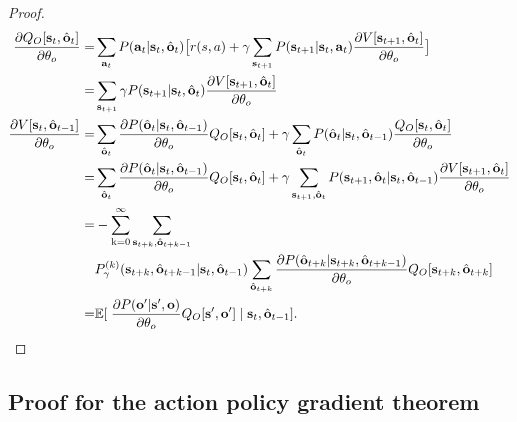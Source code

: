 \begin{proof}
    \begin{align*}
      \frac{\partial Q_O[{\mathbf{s}}_t,\hat{{\mathbf{o}}}_t]}{ \partial \theta_o }=& \sum_{{\mathbf{a}}_t}P({\mathbf{a}}_t|{\mathbf{s}}_t,\hat{{\mathbf{o}}}_t)\big[r(s,a) + \gamma\sum_{{\mathbf{s}}_{t+1}}P({\mathbf{s}}_{t+1}|{\mathbf{s}}_t,{\mathbf{a}}_t)\frac{\partial V[{\mathbf{s}}_{t+1},\hat{{\mathbf{o}}}_t]}{\partial \theta_o}\big]\\
      =&\sum_{{\mathbf{s}}_{t+1}}\gamma P({\mathbf{s}}_{t+1}|{\mathbf{s}}_t,\hat{{\mathbf{o}}}_t)\frac{\partial V[{\mathbf{s}}_{t+1},\hat{{\mathbf{o}}}_t]}{\partial \theta_o}\\
      \frac{\partial V[{\mathbf{s}}_t,\hat{{\mathbf{o}}}_{t-1}]}{\partial \theta_o}=&\sum_{\hat{{\mathbf{o}}}_t}\frac{\partial P(\hat{{\mathbf{o}}}_t|{\mathbf{s}}_t,\hat{{\mathbf{o}}}_{t-1})}{\partial \theta_o}Q_O[{\mathbf{s}}_t,\hat{{\mathbf{o}}}_t]+\gamma\sum_{\hat{{\mathbf{o}}}_t}P(\hat{{\mathbf{o}}}_t|{\mathbf{s}}_t,\hat{{\mathbf{o}}}_{t-1})\frac{Q_O[{\mathbf{s}}_t,\hat{{\mathbf{o}}}_t]}{\partial \theta_o}\\
      =&\sum_{\hat{{\mathbf{o}}}_t}\frac{\partial P(\hat{{\mathbf{o}}}_t|{\mathbf{s}}_t,\hat{{\mathbf{o}}}_{t-1})}{\partial \theta_o}Q_O[{\mathbf{s}}_t,\hat{{\mathbf{o}}}_t]
         +\gamma\sum_{{\mathbf{s}}_{t+1},\hat{{\mathbf{o}}}_t}P({\mathbf{s}}_{t+1},\hat{{\mathbf{o}}}_t|{\mathbf{s}}_t,\hat{{\mathbf{o}}}_{t-1})\frac{\partial V[{\mathbf{s}}_{t+1},\hat{{\mathbf{o}}}_t]}{\partial \theta_o}\\
      =&-\sum_{{\textnormal{k}}=0}^\infty\sum_{{\mathbf{s}}_{t+k},\hat{{\mathbf{o}}}_{t+k-1}}\\
                                                              &P_{\gamma}^{(k)}({\mathbf{s}}_{t+k},\hat{{\mathbf{o}}}_{t+k-1}|{\mathbf{s}}_{t},\hat{{\mathbf{o}}}_{t-1})\sum_{\hat{{\mathbf{o}}}_{t+k}}\frac{\partial P(\hat{{\mathbf{o}}}_{t+k}|{\mathbf{s}}_{t+k},\hat{{\mathbf{o}}}_{t+k-1})}{\partial \theta_o}Q_O[ {\mathbf{s}}_{t+k},\hat{{\mathbf{o}}}_{t+k}]\\
      =&\mathbb{E}[\;\frac{\partial P({\mathbf{o}}'|{\mathbf{s}}',{\mathbf{o}})}{\partial \theta_o}Q_O[{\mathbf{s}}',{\mathbf{o}}']\;|\;{\mathbf{s}}_t,\hat{{\mathbf{o}}}_{t-1}].
  \end{align*}
\end{proof}
\subsection{Proof for the action policy gradient theorem}
\label{sec:appen_sa_a_grad}

